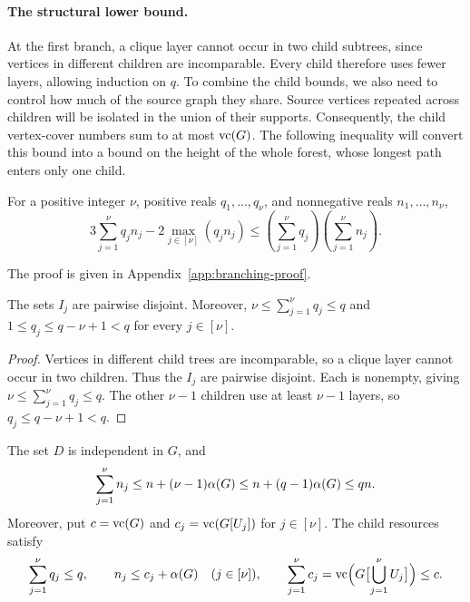 \paragraph{The structural lower bound.}

At the first branch, a clique layer cannot occur in two child
subtrees, since vertices in different children are incomparable.
Every child therefore uses fewer layers, allowing induction on $q$.
To combine the child bounds, we also need to control how much of the
source graph they share. Source vertices repeated across children
will be isolated in the union of their supports. Consequently, the
child vertex-cover numbers sum to at most $\operatorname{vc}(G)$. The following
inequality will convert this bound into a bound on the height of the
whole forest, whose longest path enters only one child.

\begin{lemma}\label{lem:branching-ineq}
For a positive integer $\nu$, positive reals $q_1,\ldots,q_\nu$, and nonnegative reals
$n_1,\ldots,n_\nu$,
\[
  3\sum_{j=1}^{\nu} q_jn_j-2\max_{j\in[\nu]}(q_jn_j)
  \leq \left(\sum_{j=1}^{\nu} q_j\right)\left(\sum_{j=1}^{\nu} n_j\right).
\]
\end{lemma}

The proof is given in Appendix~\ref{app:branching-proof}.

\begin{lemma}\label{lem:ugc-layer-usage}
The sets $I_j$ are pairwise disjoint. Moreover,
$\nu\leq\sum_{j=1}^{\nu} q_j\leq q$ and $1\leq q_j\leq q-\nu+1<q$ for every
$j\in[\nu]$.
\end{lemma}

\begin{proof}
Vertices in different child trees are incomparable, so a clique
layer cannot occur in two children. Thus the $I_j$ are pairwise
disjoint. Each is nonempty, giving $\nu\leq\sum_{j=1}^{\nu} q_j\leq q$.
The other $\nu-1$ children use at least $\nu-1$ layers, so
$q_j\leq q-\nu+1<q$.
\end{proof}

\begin{lemma}
\label{lem:ugc-source-supports}
The set $D$ is independent in $G$, and
\begin{equation}\label{eq:ugc-support-count}
 \sum_{j=1}^{\nu} n_j\leq n+(\nu-1)\alpha(G)\leq
 n+(q-1)\alpha(G)\leq qn.
\end{equation}
Moreover, put $c=\operatorname{vc}(G)$ and $c_j=\operatorname{vc}(G[U_j])$ for $j\in[\nu]$.
The child resources satisfy
\begin{equation}\label{eq:ugc-child-source-bounds}
 \sum_{j=1}^{\nu}q_j\leq q,\qquad
 n_j\leq c_j+\alpha(G)\quad(j\in[\nu]),\qquad
 \sum_{j=1}^{\nu}c_j
 =\operatorname{vc}\Bigl(G\bigl[\bigcup_{j=1}^{\nu} U_j\bigr]\Bigr)\leq c.
\end{equation}
\end{lemma}

